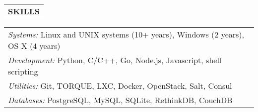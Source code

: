 \begin{tabularx}{\textwidth}{ L }
  \textbf{SKILLS} \\
\end{tabularx}

\begin{small}
\begin{tabularx}{\textwidth}{ L }
    \textit{Systems:} Linux and UNIX systems (10+ years), Windows (2 years), OS X (4 years) \\
    \textit{Development:} Python, C/C++, Go, Node.js, Javascript, shell scripting \\
    \textit{Utilities:} Git, TORQUE, LXC, Docker, OpenStack, Salt, Consul \\
    \textit{Databases:} PostgreSQL, MySQL, SQLite, RethinkDB, CouchDB \\
\end{tabularx}
\end{small}

